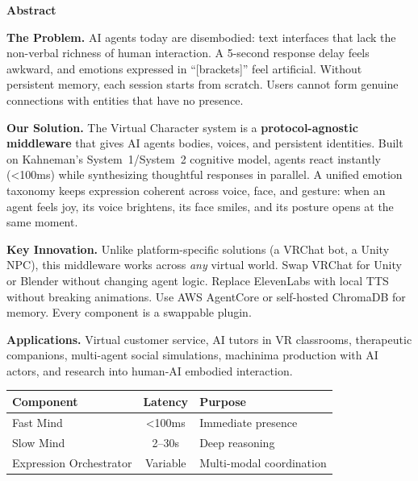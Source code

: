 \documentclass[11pt,letterpaper]{article}
\renewcommand{\arraystretch}{1.3}
\begin{document}
\thispagestyle{empty}
\begin{center}
{\color{vcprimary}\Large\bfseries Abstract}
\end{center}
\vspace{0.2cm}

\begin{tcolorbox}[
  enhanced,
  colback=lightgray,
  colframe=vcprimary!50,
  boxrule=1pt,
  arc=5pt,
  left=10pt, right=10pt, top=10pt, bottom=10pt
]
\setlength{\parskip}{0.6em}
\textbf{The Problem.} AI agents today are disembodied: text interfaces that lack the non-verbal richness of human interaction. A 5-second response delay feels awkward, and emotions expressed in ``[brackets]'' feel artificial. Without persistent memory, each session starts from scratch. Users cannot form genuine connections with entities that have no presence.

\textbf{Our Solution.} The Virtual Character system is a \textbf{protocol-agnostic middleware} that gives AI agents bodies, voices, and persistent identities. Built on Kahneman's System~1/System~2 cognitive model, agents react instantly (<100ms) while synthesizing thoughtful responses in parallel. A unified emotion taxonomy keeps expression coherent across voice, face, and gesture: when an agent feels joy, its voice brightens, its face smiles, and its posture opens at the same moment.

\textbf{Key Innovation.} Unlike platform-specific solutions (a VRChat bot, a Unity NPC), this middleware works across \emph{any} virtual world. Swap VRChat for Unity or Blender without changing agent logic. Replace ElevenLabs with local TTS without breaking animations. Use AWS AgentCore or self-hosted ChromaDB for memory. Every component is a swappable plugin.

\textbf{Applications.} Virtual customer service, AI tutors in VR classrooms, therapeutic companions, multi-agent social simulations, machinima production with AI actors, and research into human-AI embodied interaction.
\end{tcolorbox}

\vspace{0.4cm}
\begin{center}
\renewcommand{\arraystretch}{1.3}
\begin{tabular}{lcl}
\toprule
\textbf{Component} & \textbf{Latency} & \textbf{Purpose} \\
\midrule
Fast Mind & <100ms & Immediate presence \\
Slow Mind & 2--30s & Deep reasoning \\
Expression Orchestrator & Variable & Multi-modal coordination \\
\bottomrule
\end{tabular}
\end{center}
\end{document}
